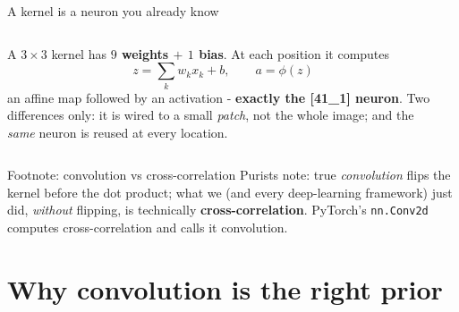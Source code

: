 \documentclass[aspectratio=169]{beamer}
\begin{document}
\begin{frame}{A kernel is a neuron you already know}
  \begin{columns}[T]
    A $3\times3$ kernel has \textbf{$9$ weights $+$ $1$ bias}. At each position it computes
    \[
      \textstyle z=\sum_{k} w_k x_k + b,\qquad a=\phi(z)
    \]
    an affine map followed by an activation - \textbf{exactly the [41\_1] neuron}.
    \vskip 6pt
    Two differences only: it is wired to a small \emph{patch}, not the whole image; and the
    \emph{same} neuron is reused at every location.
    \vskip 6pt
    \begin{center}
    \end{center}
  \end{columns}
\end{frame}

\begin{frame}{Footnote: convolution vs cross-correlation}
  Purists note: true \emph{convolution} flips the kernel before the dot product; what we
  (and every deep-learning framework) just did, \emph{without} flipping, is technically
  \textbf{cross-correlation}.
  \vskip 8pt
  PyTorch's \texttt{nn.Conv2d} computes cross-correlation and calls it convolution.
  \vskip 8pt
\end{frame}

\section{Why convolution is the right prior}
\end{document}
